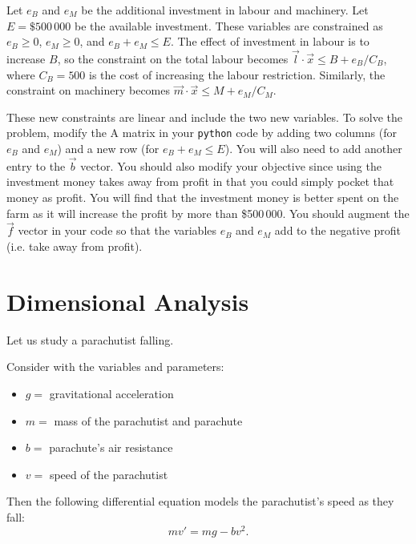 \documentclass[letter]{article}
\begin{document}
\begin{enumerate}[resume,label=\textbf{\arabic*.}]
Let $e_B$ and $e_M$ be the additional investment in labour and machinery. Let $E = \$500\,000$ be the available investment. These variables are constrained as $e_B \geq 0$, $e_M \geq 0$, and $e_B + e_M \leq E$. The effect of investment in labour is to increase $B$, so the constraint on the total labour becomes $\vec{l}\cdot \vec{x} \leq B + e_B/C_B$, where $C_B = 500$ is the cost of increasing the labour restriction. Similarly, the constraint on machinery becomes $\vec{m} \cdot \vec{x} \leq M + e_M/C_M$.

These new constraints are linear and include the two new variables. To solve the problem, modify the A matrix in your \verb|python| code by adding two columns (for $e_B$ and $e_M$) and a new row (for $e_B + e_M \leq E$). You will also need to add another entry to the $\vec{b}$ vector. You should also modify your objective since using the investment money takes away from profit in that you could simply pocket that money as profit. You will find that the investment money is better spent on the farm as it will increase the profit by more than \$500\,000. You should augment the $\vec{f}$ vector in your code so that the variables $e_B$ and $e_M$ add to the negative profit (i.e. take away from profit).
	
	
\end{enumerate}

\newpage

\section{Dimensional Analysis}

Let us study a parachutist falling.

Consider with the variables and parameters:
	\begin{itemize}
	\item $g= $ gravitational acceleration
	\item $m = $ mass of the parachutist and parachute
	\item $b = $ parachute's air resistance
	\item $v = $ speed of the parachutist
\end{itemize}

Then the following differential equation models the parachutist's speed as they fall:
	\[ mv' = mg - b v^2. \]
\end{document}
